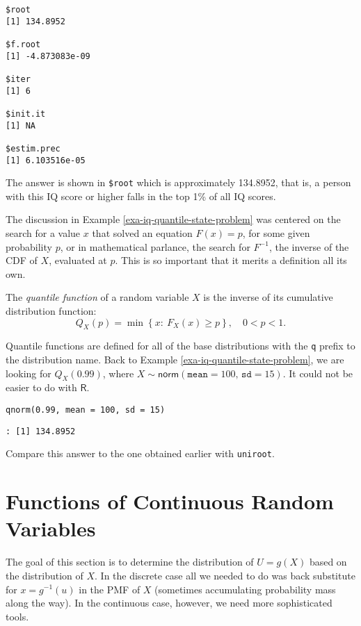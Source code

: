 \begin{verbatim}
$root
[1] 134.8952

$f.root
[1] -4.873083e-09

$iter
[1] 6

$init.it
[1] NA

$estim.prec
[1] 6.103516e-05
\end{verbatim}

The answer is shown in \texttt{\$root} which is approximately 
134.8952, that is, a person with this IQ score or higher falls in the
top 1\% of all IQ scores.


The discussion in Example \ref{exa-iq-quantile-state-problem} was centered on the search for a
value \(x\) that solved an equation \(F(x)=p\), for some given
probability \(p\), or in mathematical parlance, the search for
\(F^{-1}\), the inverse of the CDF of \(X\), evaluated at \(p\). This
is so important that it merits a definition all its own.

\begin{defn}
The \emph{quantile function} of a random variable \(X\) is
the inverse of its cumulative distribution function:
\begin{equation}
Q_{X}(p)=\min\left\{ x:\ F_{X}(x)\geq p\right\} ,\quad 0 < p <1.
\end{equation}
\end{defn}

Quantile functions are defined for all of the base distributions with
the \texttt{q} prefix to the distribution name.
Back to Example \ref{exa-iq-quantile-state-problem}, we are looking for \(Q_{X}(0.99)\), where
\(X\sim\mathsf{norm}(\mathtt{mean}=100,\,\mathtt{sd}=15)\). It could
not be easier to do with \(\mathsf{R}\).

\begin{Verbatim}
qnorm(0.99, mean = 100, sd = 15)
\end{Verbatim}

\begin{verbatim}
: [1] 134.8952
\end{verbatim}

Compare this answer to the one obtained earlier with \texttt{uniroot}.

\section{Functions of Continuous Random Variables}
\label{sec-6-4}

The goal of this section is to determine the distribution of
\(U=g(X)\) based on the distribution of \(X\). In the discrete case
all we needed to do was back substitute for \(x=g^{-1}(u)\) in the PMF
of \(X\) (sometimes accumulating probability mass along the way). In
the continuous case, however, we need more sophisticated tools.

